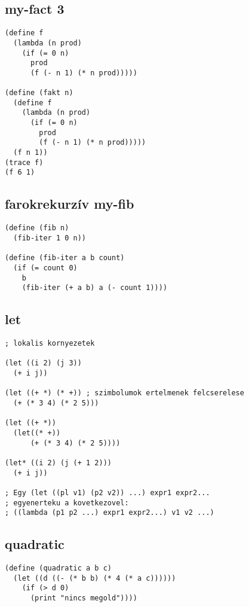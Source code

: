 \begin{multicols}{3}[]
\subsection{my-fact 3}%
\label{sub:my_fact_2}
\begin{lstlisting}
(define f
  (lambda (n prod)
    (if (= 0 n)
      prod
      (f (- n 1) (* n prod)))))

(define (fakt n)
  (define f
    (lambda (n prod)
      (if (= 0 n)
        prod
        (f (- n 1) (* n prod)))))
  (f n 1))
(trace f)
(f 6 1)
\end{lstlisting}

\subsection{farokrekurzív my-fib}%
\label{sub:farokrekurziv_my_fib}
\begin{lstlisting}
(define (fib n)
  (fib-iter 1 0 n))

(define (fib-iter a b count)
  (if (= count 0)
    b
    (fib-iter (+ a b) a (- count 1))))
\end{lstlisting}

\subsection{let}%
\label{sub:let}
\begin{lstlisting}
; lokalis kornyezetek

(let ((i 2) (j 3))
  (+ i j))

(let ((+ *) (* +)) ; szimbolumok ertelmenek felcserelese
  (+ (* 3 4) (* 2 5)))

(let ((+ *))
  (let((* +))
      (+ (* 3 4) (* 2 5))))

(let* ((i 2) (j (+ 1 2)))
  (+ i j))

; Egy (let ((pl v1) (p2 v2)) ...) expr1 expr2...
; egyenerteku a kovetkezovel:
; ((lambda (p1 p2 ...) expr1 expr2...) v1 v2 ...)
\end{lstlisting}


\subsection{quadratic}%
\label{sub:quadratic}
\begin{lstlisting}
(define (quadratic a b c)
  (let ((d ((- (* b b) (* 4 (* a c))))))
    (if (> d 0)
      (print "nincs megold"))))
\end{lstlisting}


\end{multicols}\newpage
